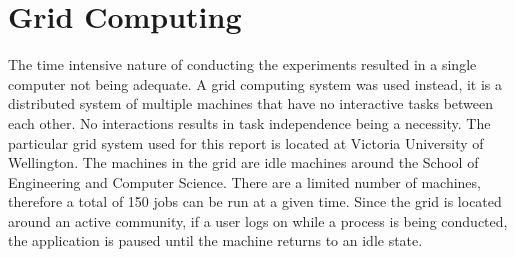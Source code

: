 \section{Grid Computing}
The time intensive nature of conducting the experiments resulted in a single computer not being adequate. A grid computing system was used instead, it is a distributed system of multiple machines that have no interactive tasks between each other. No interactions results in task independence being a necessity. The particular grid system used for this report is located at Victoria University of Wellington. The machines in the grid are idle machines around the School of Engineering and Computer Science. There are a limited number of machines, therefore a total of 150 jobs can be run at a given time. Since the grid is located around an active community, if a user logs on while a process is being conducted, the application is paused until the machine returns to an idle state.